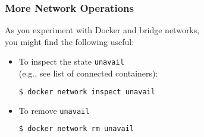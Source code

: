 \begin{frame}[fragile]

\frametitle{More Network Operations}

As you experiment with Docker and bridge networks,\\ you might find
the following useful:

\begin{itemize}

\item To inspect the state \texttt{unavail}\\ (e.g., see list of
connected containers):

\begin{lstlisting}[language=bash]
$ docker network inspect unavail
\end{lstlisting}

\item To remove \texttt{unavail}

\begin{lstlisting}[language=bash]
$ docker network rm unavail
\end{lstlisting}

\end{itemize}

\end{frame}
